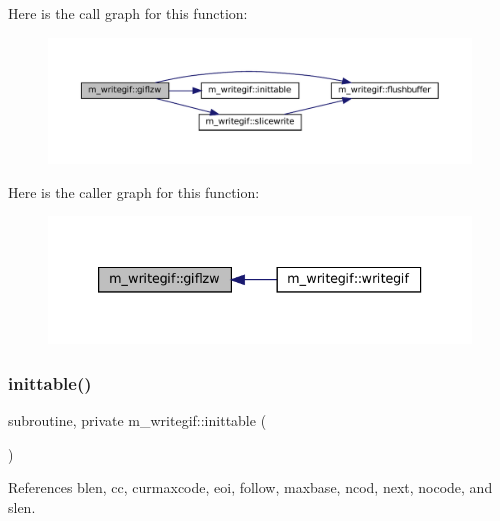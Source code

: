 Here is the call graph for this function\+:
\nopagebreak
\begin{figure}[H]
\begin{center}
\leavevmode
\includegraphics[width=350pt]{namespacem__writegif_a13c09be69495f4ba21ecb7c134216a17_cgraph}
\end{center}
\end{figure}
Here is the caller graph for this function\+:
\nopagebreak
\begin{figure}[H]
\begin{center}
\leavevmode
\includegraphics[width=333pt]{namespacem__writegif_a13c09be69495f4ba21ecb7c134216a17_icgraph}
\end{center}
\end{figure}
\mbox{\label{namespacem__writegif_aed61b15f90188ddf39b71aa0c73a82a8}} 
\subsubsection{\texorpdfstring{inittable()}{inittable()}}
{\footnotesize\ttfamily subroutine, private m\+\_\+writegif\+::inittable (\begin{DoxyParamCaption}{ }\end{DoxyParamCaption})\hspace{0.3cm}{\ttfamily [private]}}



References blen, cc, curmaxcode, eoi, follow, maxbase, ncod, next, nocode, and slen.

